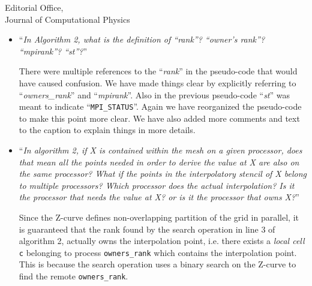 \documentclass{scrlttr2}
\begin{document}
\begin{letter} {Editorial Office, \\ Journal of Computational
Physics}
\begin{itemize}
\begin{itemize}
Our library is coded in `\texttt{c++}' (with a mix of little `\texttt{c}' code).
We have made adjustments to the to algorithms to make them easier to understand.
However, we believe it is best not to directly use a `\texttt{c++}' syntax to
keep the pseudo-code language-agnostic and accessible to all readers.
\\
\item ``\textit{In Algorithm 2, what is the definition of “rank”? “owner’s
  rank”? “mpirank”? “st”?}''

There were multiple references to the ``\textit{rank}'' in the pseudo-code that 
would have caused confusion. We have made things clear by explicitly referring 
to ``\textit{owners\_rank}'' and ``\textit{mpirank}''. Also in the previous
pseudo-code ``\textit{st}'' was meant to indicate ``\texttt{MPI\_STATUS}''. Again
we have reorganized the pseudo-code to make this point more clear. We have also
added more comments and text to the caption to explain things in more details.
\\
\item ``\textit{In algorithm 2, if X is contained within the mesh on a given
  processor, does that mean all the points needed in order to derive the value
at X are also on the same processor? What if the points in the interpolatory
stencil of X belong to multiple processors? Which processor does the actual
interpolation? Is it the processor that needs the value at X? or is it the
processor that owns X?}''

Since the Z-curve defines non-overlapping partition of the grid in parallel, it
is guaranteed that the rank found by the search operation in line 3 of algorithm
2, actually owns the interpolation point, i.e. there exists a \textit{local
cell} \texttt{c} belonging to process \texttt{owners\_rank} which contains the
interpolation point. This is because the search operation uses a binary search
on the Z-curve to find the remote \texttt{owners\_rank}.


\end{itemize}
\end{itemize}
\end{letter}
\end{document}
